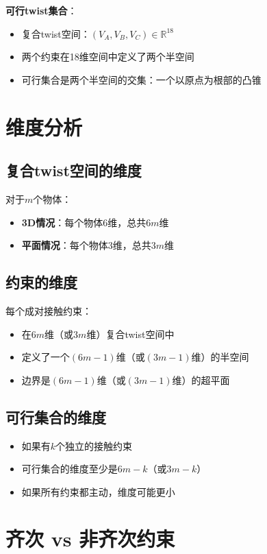 \documentclass[12pt,a4paper]{article}
\begin{document}
\textbf{可行twist集合}：
\begin{itemize}
\item 复合twist空间：$(V_A, V_B, V_C) \in \mathbb{R}^{18}$
\item 两个约束在18维空间中定义了两个半空间
\item 可行集合是两个半空间的交集：一个以原点为根部的凸锥
\end{itemize}

\section{维度分析}

\subsection{复合twist空间的维度}

对于$m$个物体：
\begin{itemize}
\item \textbf{3D情况}：每个物体6维，总共$6m$维
\item \textbf{平面情况}：每个物体3维，总共$3m$维
\end{itemize}

\subsection{约束的维度}

每个成对接触约束：
\begin{itemize}
\item 在$6m$维（或$3m$维）复合twist空间中
\item 定义了一个$(6m-1)$维（或$(3m-1)$维）的半空间
\item 边界是$(6m-1)$维（或$(3m-1)$维）的超平面
\end{itemize}

\subsection{可行集合的维度}

\begin{itemize}
\item 如果有$k$个独立的接触约束
\item 可行集合的维度至少是$6m - k$（或$3m - k$）
\item 如果所有约束都主动，维度可能更小
\end{itemize}

\section{齐次 vs 非齐次约束}
\end{document}
